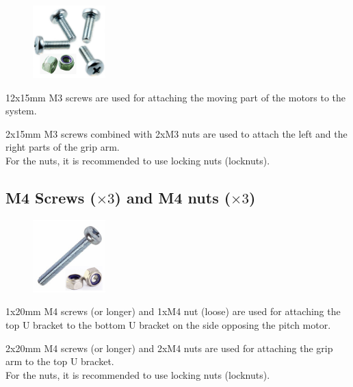 \begin{figure}
    \vspace{-1.5cm}
    \includegraphics[width=0.25\textwidth]{GenericParts/M3ScrewsLocknuts.png}
\end{figure}

12x15mm M3 screws are used for attaching the moving part of the motors to the system.

2x15mm M3 screws combined with 2xM3 nuts are used to attach the left and the right parts of the grip arm.\\

\raisebox{-0.2cm}{\hspace{-1.5cm}\Huge\Info}\normalsize \quad For the nuts, it is recommended to use locking nuts (locknuts).


\subsection{M4 Screws ($\times3$) and M4 nuts ($\times3$)}

\begin{figure}
    \vspace{-1.5cm}
    \includegraphics[width=0.25\textwidth]{GenericParts/M4ScrewsLocknuts.png}
\end{figure}

1x20mm M4 screws (or longer) and 1xM4 nut (loose) are used for attaching the top U bracket to the bottom U bracket on the side opposing the pitch motor.

2x20mm M4 screws (or longer) and 2xM4 nuts are used for attaching the grip arm to the top U bracket.\\

\raisebox{-0.2cm}{\hspace{-1.5cm}\Huge\Info}\normalsize \quad For the nuts, it is recommended to use locking nuts (locknuts).


